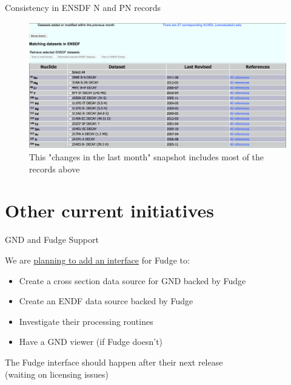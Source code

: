 \documentclass[xcolor=x11names,compress]{beamer}
\renewcommand{\(}{\begin{columns}}
\renewcommand{\)}{\end{columns}}
\newcommand{\<}[1]{\begin{column}{#1}}
\renewcommand{\>}{\end{column}}
\begin{document}
\begin{frame}{Consistency in ENSDF N and PN records}
   
    \begin{figure}
      \includegraphics[height=5.5cm]{ensdf_updates}
      \caption{This "changes in the last month" snapshot includes most of 
      the records above}
    \end{figure}

\end{frame}

\section{Other current initiatives}
\begin{frame}{GND and Fudge Support}

    We are \href{https://github.com/pyne/pyne/issues/236}{planning to add an interface}
    for \alert{Fudge} to: 

    \vspace*{1 em}

    \begin{itemize}
      \item Create a cross section data source for GND backed by Fudge
      \item Create an ENDF data source backed by Fudge
      \item Investigate their processing routines
      \item Have a GND viewer (if Fudge doesn't)
    \end{itemize}
    
    \vspace*{1 em}
    The Fudge interface should happen after their next release\\
    \hspace*{1.5 em}(waiting on licensing issues)

\end{frame}
\end{document}

